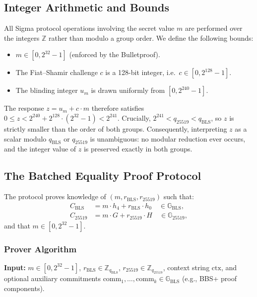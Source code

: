 \documentclass[11pt]{article}
\theoremstyle{definitionstyle}
\theoremstyle{plain}
\begin{document}
\subsection{Integer Arithmetic and Bounds}

All Sigma protocol operations involving the secret value $m$ are performed over the integers $\mathbb{Z}$ rather than modulo a group order. We define the following bounds:

\begin{itemize}
\item $m \in [0, 2^{32}-1]$ (enforced by the Bulletproof).
\item The Fiat--Shamir challenge $c$ is a 128-bit integer, i.e.\ $c \in [0, 2^{128}-1]$.
\item The blinding integer $u_m$ is drawn uniformly from $[0, 2^{240}-1]$.
\end{itemize}

The response $z = u_m + c \cdot m$ therefore satisfies $0 \le z < 2^{240} + 2^{128} \cdot (2^{32}-1) < 2^{241}$. Crucially, $2^{241} < q_{25519} < q_{\text{BLS}}$, so $z$ is strictly smaller than the order of both groups. Consequently, interpreting $z$ as a scalar modulo $q_{\text{BLS}}$ or $q_{25519}$ is unambiguous: no modular reduction ever occurs, and the integer value of $z$ is preserved exactly in both groups.

\subsection{The Batched Equality Proof Protocol}

The protocol proves knowledge of $(m, r_{\text{BLS}}, r_{25519})$ such that:
\[
\begin{aligned}
C_{\text{BLS}} &= m \cdot h_4 + r_{\text{BLS}} \cdot h_0 \quad \in \mathbb{G}_{\text{BLS}}, \\
C_{25519} &= m \cdot G + r_{25519} \cdot H \quad \in \mathbb{G}_{25519},
\end{aligned}
\]
and that $m \in [0, 2^{32}-1]$.

\subsubsection{Prover Algorithm}

\textbf{Input:} $m \in [0, 2^{32}-1]$, $r_{\text{BLS}} \in \mathbb{Z}_{q_{\text{BLS}}}$, $r_{25519} \in \mathbb{Z}_{q_{25519}}$, context string $\text{ctx}$, and optional auxiliary commitments $\text{comm}_1,\dots,\text{comm}_k \in \mathbb{G}_{\text{BLS}}$ (e.g., BBS+ proof components).
\end{document}
